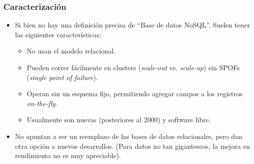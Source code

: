 \begin{frame}
\frametitle{Caracterización}
\begin{itemize}

\item	Si bien no hay una definición precisa de ``Base de datos
	NoSQL''. Suelen tener las siguientes características:
	\pause
	\begin{itemize}
	\item	No usan el modelo relacional.
		\pause

	\item	Pueden correr fácilmente en clusters (\textit{scale-out}
		vs. \textit{scale-up}) sin SPOFs (\textit{single point of
		failure}).
		\pause

	\item	Operan sin un esquema fijo, permitiendo agregar campos
		a los registros \textit{on-the-fly}.
		\pause

	\item	Usualmente son nuevas (posteriores al 2000) y software
		libre.
	\end{itemize}
	\pause

\item	No apuntan a ser un reemplazo de las bases de datos relacionales,
	pero dan otra opción a nuevos desarrollos. (Para datos no tan
	gigantescos, la mejora en rendimiento no es muy apreciable).
\end{itemize}
\end{frame}
